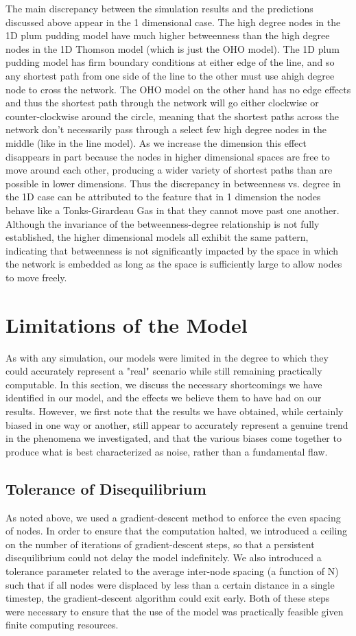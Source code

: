 \documentclass[aps,pre,reprint,superscriptaddress,amsmath,amssymb]{revtex4-1}
\begin{document}
The main discrepancy between the simulation results and the predictions discussed above appear in the 1 dimensional case.
The high degree nodes in the 1D plum pudding model have much higher betweenness than the high degree nodes in the 1D Thomson model (which is just the OHO model).
The 1D plum pudding model has firm boundary conditions at either edge of the line, and so any shortest path from one side of the line to the other must use ahigh degree node to cross the network.
The OHO model on the other hand has no edge effects and thus the shortest path through the network will go either clockwise or counter-clockwise around the circle, meaning that the shortest paths across the network don't necessarily pass through a select few high degree nodes in the middle (like in the line model).
As we increase the dimension this effect disappears in part because the nodes in higher dimensional spaces are free to move around each other, producing a wider variety of shortest paths than are possible in lower dimensions. 
Thus the discrepancy in betweenness vs. degree in the 1D case can be attributed to the feature that in 1 dimension the nodes behave like a Tonks-Girardeau Gas in that they cannot move past one another.
Although the invariance of the betweenness-degree relationship is not fully established, the higher dimensional models all exhibit the same pattern, indicating that betweenness is not significantly impacted by the space in which the network is embedded as long as the space is sufficiently large to allow nodes to move freely.

\section{Limitations of the Model}
As with any simulation, our models were limited in the degree to which they could accurately represent a "real" scenario while still remaining practically computable.  In this section, we discuss the necessary shortcomings we have identified in our model, and the effects we believe them to have had on our results.  However, we first note that the results we have obtained, while certainly biased in one way or another, still appear to accurately represent a genuine trend in the phenomena we investigated, and that the various biases come together to produce what is best characterized as noise, rather than a fundamental flaw.

\subsection{Tolerance of Disequilibrium}
As noted above, we used a gradient-descent method to enforce the even spacing of nodes.  In order to ensure that the computation halted, we introduced a ceiling on the number of iterations of gradient-descent steps, so that a persistent disequilibrium could not delay the model indefinitely.  We also introduced a tolerance parameter related to the average inter-node spacing (a function of N) such that if all nodes were displaced by less than a certain distance in a single timestep, the gradient-descent algorithm could exit early.  Both of these steps were necessary to ensure that the use of the model was practically feasible given finite computing resources.
\end{document}
